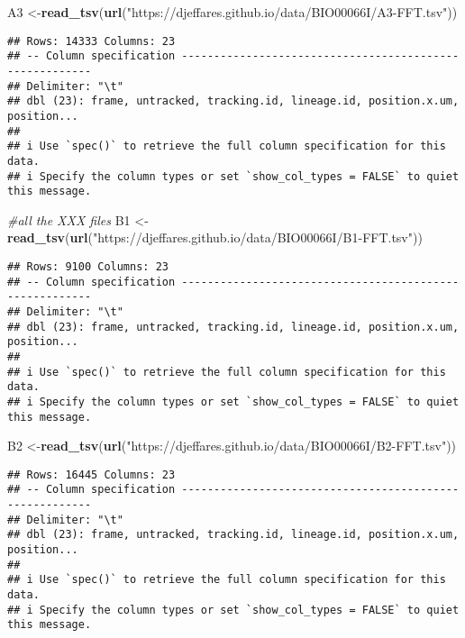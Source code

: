 \documentclass[
]{article}
\newenvironment{Shaded}{\begin{snugshade}}{\end{snugshade}}
\newcommand{\CommentTok}[1]{\textcolor[rgb]{0.56,0.35,0.01}{\textit{#1}}}
\newcommand{\FunctionTok}[1]{\textcolor[rgb]{0.13,0.29,0.53}{\textbf{#1}}}
\newcommand{\NormalTok}[1]{#1}
\newcommand{\OtherTok}[1]{\textcolor[rgb]{0.56,0.35,0.01}{#1}}
\newcommand{\StringTok}[1]{\textcolor[rgb]{0.31,0.60,0.02}{#1}}
\begin{document}
\begin{Shaded}
\begin{Highlighting}[]
\NormalTok{A3 }\OtherTok{\textless{}{-}}\FunctionTok{read\_tsv}\NormalTok{(}\FunctionTok{url}\NormalTok{(}\StringTok{"https://djeffares.github.io/data/BIO00066I/A3{-}FFT.tsv"}\NormalTok{))}
\end{Highlighting}
\end{Shaded}

\begin{verbatim}
## Rows: 14333 Columns: 23
## -- Column specification --------------------------------------------------------
## Delimiter: "\t"
## dbl (23): frame, untracked, tracking.id, lineage.id, position.x.um, position...
## 
## i Use `spec()` to retrieve the full column specification for this data.
## i Specify the column types or set `show_col_types = FALSE` to quiet this message.
\end{verbatim}

\begin{Shaded}
\begin{Highlighting}[]
\CommentTok{\#all the XXX files}
\NormalTok{B1 }\OtherTok{\textless{}{-}}\FunctionTok{read\_tsv}\NormalTok{(}\FunctionTok{url}\NormalTok{(}\StringTok{"https://djeffares.github.io/data/BIO00066I/B1{-}FFT.tsv"}\NormalTok{))}
\end{Highlighting}
\end{Shaded}

\begin{verbatim}
## Rows: 9100 Columns: 23
## -- Column specification --------------------------------------------------------
## Delimiter: "\t"
## dbl (23): frame, untracked, tracking.id, lineage.id, position.x.um, position...
## 
## i Use `spec()` to retrieve the full column specification for this data.
## i Specify the column types or set `show_col_types = FALSE` to quiet this message.
\end{verbatim}

\begin{Shaded}
\begin{Highlighting}[]
\NormalTok{B2 }\OtherTok{\textless{}{-}}\FunctionTok{read\_tsv}\NormalTok{(}\FunctionTok{url}\NormalTok{(}\StringTok{"https://djeffares.github.io/data/BIO00066I/B2{-}FFT.tsv"}\NormalTok{))}
\end{Highlighting}
\end{Shaded}

\begin{verbatim}
## Rows: 16445 Columns: 23
## -- Column specification --------------------------------------------------------
## Delimiter: "\t"
## dbl (23): frame, untracked, tracking.id, lineage.id, position.x.um, position...
## 
## i Use `spec()` to retrieve the full column specification for this data.
## i Specify the column types or set `show_col_types = FALSE` to quiet this message.
\end{verbatim}
\end{document}
